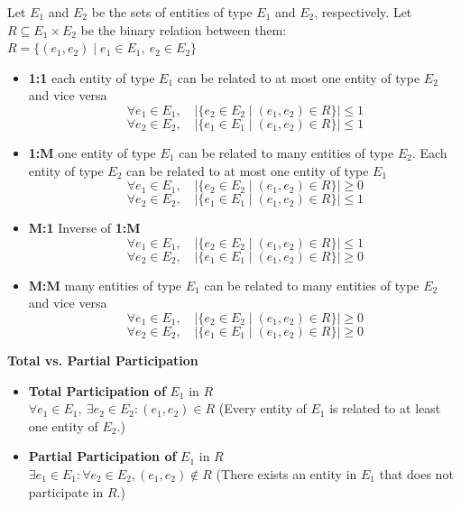 \documentclass{article}
\begin{document}

Let $E_1$ and $E_2$ be the sets of entities of type $E_1$ and $E_2$, respectively. Let $R \subseteq E_1 \times E_2$ be the binary relation between them: $R = \{ (e_1, e_2) \mid e_1 \in E_1,\ e_2 \in E_2 \}$
\begin{itemize}
    \item \textbf{1:1 }each entity of type $E_1$ can be related to at most one entity of type $E_2$ and vice versa
    \[
    \forall e_1 \in E_1, \quad |\{ e_2 \in E_2 \mid (e_1, e_2) \in R \}| \leq 1
    \]
    \[
    \forall e_2 \in E_2, \quad |\{ e_1 \in E_1 \mid (e_1, e_2) \in R \}| \leq 1
    \]
    \item \textbf{1:M }one entity of type $E_1$ can be related to many entities of type $E_2$. Each entity of type $E_2$ can be related to at most one entity of type $E_1$
    \[
        \forall e_1 \in E_1, \quad |\{ e_2 \in E_2 \mid (e_1, e_2) \in R \}| \geq 0
        \]
        \[
        \forall e_2 \in E_2, \quad |\{ e_1 \in E_1 \mid (e_1, e_2) \in R \}| \leq 1
    \]
    \item \textbf{M:1 }Inverse of \textbf{1:M }
    \[
        \forall e_1 \in E_1, \quad |\{ e_2 \in E_2 \mid (e_1, e_2) \in R \}| \leq 1
        \]
        \[
        \forall e_2 \in E_2, \quad |\{ e_1 \in E_1 \mid (e_1, e_2) \in R \}| \geq 0
    \]
    \item \textbf{M:M }many entities of type $E_1$ can be related to many entities of type $E_2$ and vice versa
    \[
        \forall e_1 \in E_1, \quad |\{ e_2 \in E_2 \mid (e_1, e_2) \in R \}| \geq 0
        \]
        \[
        \forall e_2 \in E_2, \quad |\{ e_1 \in E_1 \mid (e_1, e_2) \in R \}| \geq 0
    \]
\end{itemize}

\textbf{Total vs. Partial Participation}
\begin{itemize}
    \item \textbf{Total Participation of } $E_1$ in $R$ \\
    $\forall e_1 \in E_1, \ \exists e_2 \in E_2 : (e_1, e_2) \in R$  
    (Every entity of $E_1$ is related to at least one entity of $E_2$.)

    \item \textbf{Partial Participation of } $E_1$ in $R$ \\
    $\exists e_1 \in E_1: \forall e_2 \in E_2, (e_1, e_2) \notin R$  
    (There exists an entity in $E_1$ that does not participate in $R$.)
\end{itemize}
\end{document}
